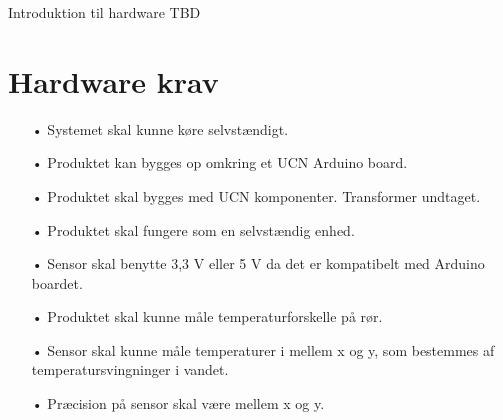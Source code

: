 Introduktion til hardware TBD
\section{Hardware krav}
\begin{enumerate}
	\item[•]Systemet skal kunne køre selvstændigt.
	\item[•]Produktet kan bygges op omkring et UCN Arduino board. 
	\item[•]Produktet skal bygges med UCN komponenter. Transformer undtaget.
	\item[•]Produktet skal fungere som en selvstændig enhed.
	\item[•]Sensor skal benytte 3,3 V eller 5 V da det er kompatibelt med Arduino boardet.
	\item[•]Produktet skal kunne måle temperaturforskelle på rør.
	\item[•]Sensor skal kunne måle temperaturer i mellem x og y, som bestemmes af temperatursvingninger i vandet.
	\item[•]Præcision på sensor skal være mellem x og y.
\end{enumerate}	

